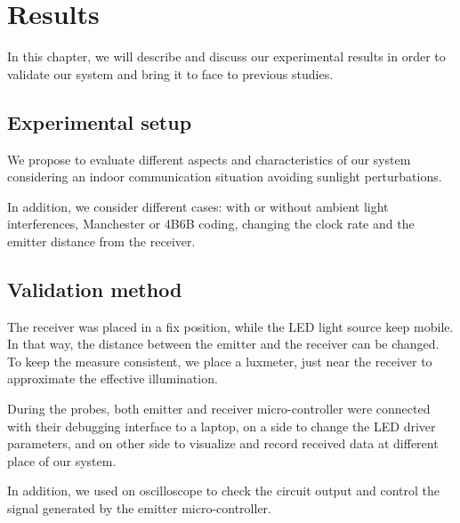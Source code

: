 
\chapter{Results} %

\label{Results} %


In this chapter, we will describe and discuss our experimental results in order to validate our system and bring it to face to previous studies.
 

\section{Experimental setup}

We propose to evaluate different aspects and characteristics of our system considering an indoor communication situation avoiding sunlight perturbations.

In addition, we consider different cases: with or without ambient light interferences, Manchester or 4B6B coding, changing the clock rate and the emitter distance from the receiver. 

\section{Validation method}

The receiver was placed in a fix position, while the LED light source keep mobile. In that way, the distance between the emitter and the receiver can  be changed. To keep the measure consistent, we place a luxmeter, just near the receiver to approximate the effective illumination.

During the probes, both emitter and receiver micro-controller were connected with their debugging interface to a laptop, on a side to change the LED driver parameters, and on other side to visualize and record received data at different place of our system. 

In addition, we used on oscilloscope to check the circuit output and control the signal generated by the emitter micro-controller.

